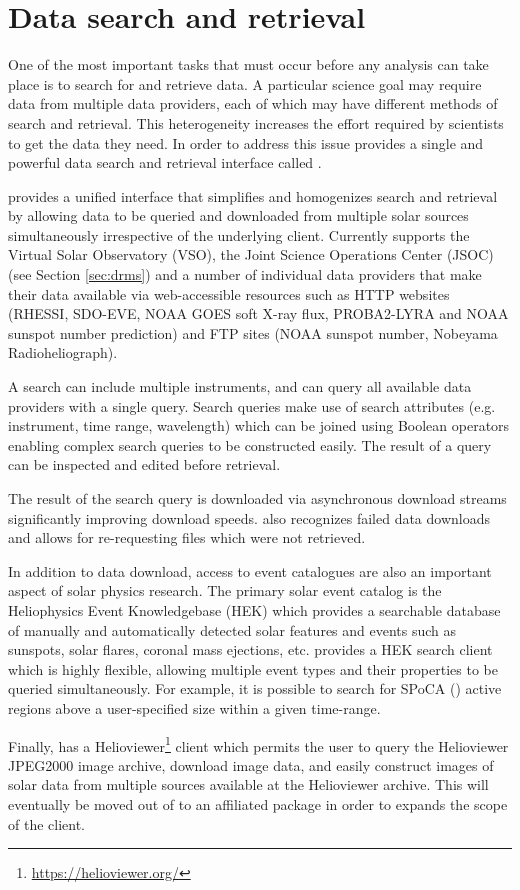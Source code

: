\section{Data search and retrieval}
\label{sec:fido}

One of the most important tasks that must occur before any analysis can take place is to search for and retrieve data.
A particular science goal may require data from multiple data providers, each of which may have different methods of search and retrieval.
This heterogeneity increases the effort required by scientists to get the data they need.
In order to address this issue \sunpypkg provides a single and powerful data search and retrieval interface called \Fido. 

\Fido provides a unified interface that simplifies and homogenizes search and retrieval by allowing data to be queried and downloaded from multiple solar sources simultaneously irrespective of the underlying client.
Currently \Fido supports the Virtual Solar Observatory (VSO), the Joint Science Operations Center (JSOC) (see Section \ref{sec:drms}) and a number of individual data providers that make their data available via web-accessible resources such as HTTP websites (RHESSI, SDO-EVE, NOAA GOES soft X-ray flux, PROBA2-LYRA and NOAA sunspot number prediction) and FTP sites (NOAA sunspot number, Nobeyama Radioheliograph).

A \Fido search can include multiple instruments, and can query all available data providers with a single query.
Search queries make use of search attributes (e.g. instrument, time range, wavelength) which can be joined using Boolean operators enabling complex search queries to be constructed easily.
The result of a query can be inspected and edited before retrieval.

The result of the \Fido search query is downloaded via asynchronous download streams significantly improving download speeds.
\Fido also recognizes failed data downloads and allows for re-requesting files which were not retrieved.

In addition to data download, access to event catalogues are also an important aspect of solar physics research. 
The primary solar event catalog is the Heliophysics Event Knowledgebase (HEK) which provides a searchable database of manually and automatically detected solar features and events such as sunspots, solar flares, coronal mass ejections, etc. \sunpypkg provides a HEK search client which is highly flexible, allowing multiple event types and their properties to be queried simultaneously.
For example, it is possible to search for SPoCA (\cite{2014AA...561A..29V}) active regions above a user-specified size within a given time-range.

Finally, \sunpypkg has a Helioviewer\footnote{\url{https://helioviewer.org/}} client which permits the user to query the Helioviewer JPEG2000 image archive, download image data, and easily construct images of solar data from multiple sources available at the Helioviewer archive.
This will eventually  be moved out of \sunpypkg to an affiliated package in order to expands the scope of the client.
